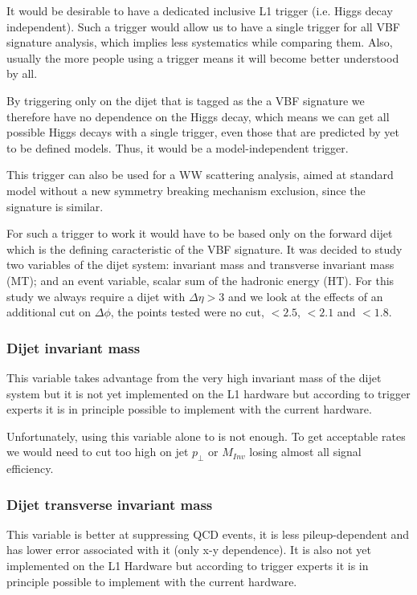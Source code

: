 \documentclass[%
reprint,
amsmath,
amssymb,
aps,
pra,
showkeys
]{revtex4-1}
\begin{document}
It would be desirable to have a dedicated inclusive L1 trigger (i.e. Higgs decay independent). Such a trigger
would allow us to have a single trigger for all VBF signature analysis, which implies less systematics
while comparing them. Also, usually the more people using a trigger means it will become better understood by all.

By triggering only on the dijet that is tagged as the a VBF signature we therefore have no dependence on the Higgs 
decay, which means we can get all possible Higgs decays with a single trigger, even those that are predicted by 
yet to be defined models. Thus, it would be a model-independent trigger.

This trigger can also be used for a WW scattering analysis, aimed at standard model without a new symmetry 
breaking mechanism exclusion, since the signature is similar.

For such a trigger to work it would have to be based only on the forward dijet which is the defining caracteristic
of the VBF signature.
It was decided to study two variables of the dijet system: invariant mass and transverse invariant mass (MT); and an event 
variable, scalar sum of the hadronic energy (HT). For this study we always require a dijet with $\Delta\eta>3$ and we 
look at the effects of an additional cut on $\Delta\phi$, the points tested were no cut, $<2.5$, $<2.1$ and $<1.8$.

\subsubsection{Dijet invariant mass}

This variable takes advantage from the very high invariant mass of the dijet system but it is not yet implemented
on the L1 hardware but according to trigger experts it is in principle possible to implement with the current hardware.

Unfortunately, using this variable alone to is not enough. To get acceptable rates we would need to cut too high on
jet $p_\bot$ or $M_{Inv}$ losing almost all signal efficiency.

\subsubsection{Dijet transverse invariant mass}

This variable is better at suppressing QCD events, it is less pileup-dependent and has lower error associated with it
(only x-y dependence). It is also not yet implemented on the L1 Hardware but according to trigger experts it is in principle 
possible to implement with the current hardware.
\end{document}
